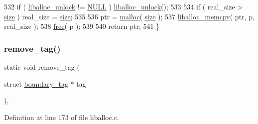 \begin{DoxyCode}
532     \textcolor{keywordflow}{if} ( \hyperlink{a00038_aedc23f198b2882d41d0caa316453967b_aedc23f198b2882d41d0caa316453967b}{liballoc\_unlock} != \hyperlink{a00038_a070d2ce7b6bb7e5c05602aa8c308d0c4_a070d2ce7b6bb7e5c05602aa8c308d0c4}{NULL} ) \hyperlink{a00038_aedc23f198b2882d41d0caa316453967b_aedc23f198b2882d41d0caa316453967b}{liballoc\_unlock}();
533 
534     \textcolor{keywordflow}{if} ( real\_size > \hyperlink{a00126_a29b056a39f6022d32468e7913e6df936_a29b056a39f6022d32468e7913e6df936}{size} ) real\_size = \hyperlink{a00126_a29b056a39f6022d32468e7913e6df936_a29b056a39f6022d32468e7913e6df936}{size};
535 
536     ptr = \hyperlink{a00035_a7ac38fce3243a7dcf448301ee9ffd392_a7ac38fce3243a7dcf448301ee9ffd392}{malloc}( \hyperlink{a00126_a29b056a39f6022d32468e7913e6df936_a29b056a39f6022d32468e7913e6df936}{size} );
537     \hyperlink{a00035_a58b3101a659b6a2f7e2ca290bef6bfb4_a58b3101a659b6a2f7e2ca290bef6bfb4}{liballoc\_memcpy}( ptr, p, real\_size );
538     \hyperlink{a00035_afbedc913aa4651b3c3b4b3aecd9b4711_afbedc913aa4651b3c3b4b3aecd9b4711}{free}( p );
539 
540     \textcolor{keywordflow}{return} ptr;
541 \}
\end{DoxyCode}
\mbox{\label{a00035_aeea23ead928f2a5d40fdf7687b3c99c9_aeea23ead928f2a5d40fdf7687b3c99c9}} 
\subsubsection{\texorpdfstring{remove\+\_\+tag()}{remove\_tag()}}
{\footnotesize\ttfamily static void remove\+\_\+tag (\begin{DoxyParamCaption}\item[{struct \hyperlink{a00126}{boundary\+\_\+tag} $\ast$}]{tag }\end{DoxyParamCaption})\hspace{0.3cm}{\ttfamily [inline]}, {\ttfamily [static]}}



Definition at line 173 of file liballoc.\+c.



